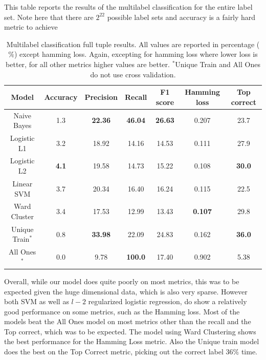 \documentclass{article} %
\begin{document}
This table reports the results of the multilabel classification for the entire label set. Note here that there are $2^{22}$ possible label sets and accuracy is a fairly hard metric to achieve
\begin{table}[h]
\begin{center}
\begin{tabular}{|c|c|c|c|c|c|c|}
\hline
 Model       & Accuracy & Precision & Recall    & F1 score  & Hamming loss & Top correct\\ \hline
 Naive Bayes & 1.3      & \bf{22.36}& \bf{46.04}& \bf{26.63}& 0.207     & 23.7      \\ \hline
 Logistic L1 & 3.2      & 18.92     & 14.16     & 14.53     & 0.111     & 27.9      \\ \hline
 Logistic L2 & \bf{4.1} & 19.58     & 14.73     & 15.22     & 0.108     & \bf{30.0} \\ \hline
 Linear SVM  & 3.7      & 20.34     & 16.40     & 16.24     & 0.115     & 22.5      \\ \hline
 Ward Cluster& 3.4      & 17.53     & 12.99     & 13.43     & \bf{0.107}& 29.8      \\ \hline \hline
 Unique Train$^*$& 0.8      & \bf{33.98}& 22.09     & 24.83     & 0.162     & \bf{36.0} \\ \hline
 All Ones$^*$    & 0.0      & 9.78      & \bf{100.0}& 17.40     & 0.902     & 5.38      \\ \hline
\end{tabular}
\caption{Multilabel classification full tuple results. All values are reported in percentage ($\%$) except hamming loss. Again, excepting for hamming loss where lower loss is better, for all other metrics higher values are better. $^*$Unique Train and All Ones do not use cross validation.}
\end{center}
\end{table}

Overall, while our model does quite poorly on most metrics, this was to be expected given the huge dimensional data, which is also
very sparse. However both SVM as well as $l-2$ regularized logistic regression, do show a relatively good performance on some metrics,
such as the Hamming loss. Most of the models beat the All Ones model on most metrics other than the recall and the Top correct, which 
was to be expected. The model using Ward Clustering shows the best performance for the Hamming Loss metric. Also the Unique train model
does the best on the Top Correct metric, picking out the correct label $36\%$ time.
\end{document}
